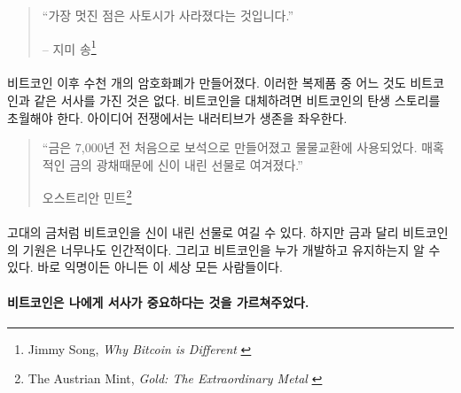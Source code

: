 \begin{quotation}\begin{samepage}
		\enquote{가장 멋진 점은 사토시가 사라졌다는 것입니다.}
		\begin{flushright} -- 지미 송\footnote{Jimmy Song, \textit{Why Bitcoin is Different} \cite{bitcoin-different}}
\end{flushright}\end{samepage}\end{quotation}

\newpage

\paragraph{}
비트코인 이후 수천 개의 암호화폐가 만들어졌다. 
이러한 복제품 중 어느 것도 비트코인과 같은 서사를 가진 것은 없다.
비트코인을 대체하려면 비트코인의 탄생 스토리를 초월해야 한다. 
아이디어 전쟁에서는 내러티브가 생존을 좌우한다.

\begin{quotation}\begin{samepage}
		\enquote{금은 7,000년 전 처음으로 보석으로 만들어졌고 물물교환에 사용되었다. 매혹적인 금의 광채때문에 신이 내린 선물로 여겨졌다.}
		\begin{flushright} 오스트리안 민트\footnote{The Austrian Mint, \textit{Gold: The Extraordinary Metal} \cite{gold-gift-gods}}
\end{flushright}\end{samepage}\end{quotation}

\paragraph{}
고대의 금처럼 비트코인을 신이 내린 선물로 여길 수 있다. 
하지만 금과 달리 비트코인의 기원은 너무나도 인간적이다. 
그리고 비트코인을 누가 개발하고 유지하는지 알 수 있다.
바로 익명이든 아니든 이 세상 모든 사람들이다.

\paragraph{비트코인은 나에게 서사가 중요하다는 것을 가르쳐주었다.}

%
%
%
%
